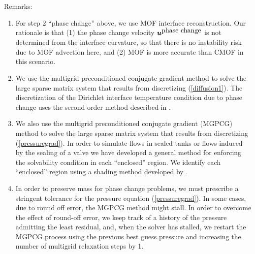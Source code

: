 \documentclass[]{article}
\newcommand{\bmu}{\mbox{\boldmath $u$\unboldmath}}
\begin{document}
Remarks:
\begin{enumerate}
\item For step 2 ``phase change'' above, we use MOF interface
 reconstruction.   Our rationale is that (1) the phase change
 velocity $\bmu^{\mbox{phase change}}$ is not  
 determined from the interface curvature, so that there is no
 instability risk due to MOF advection here, and (2) MOF is
 more accurate than CMOF in this scenario.
\item We use the multigrid preconditioned conjugate gradient 
 method \cite{tatebe1993multigrid}
 to solve the large sparse matrix system that
 results from discretizing (\ref{diffusion1}).  The discretization
 of the Dirichlet interface temperature condition due to 
 phase change uses the second order method described in 
 \cite{gibou2002second}.
\item We also use the multigrid preconditioned conjugate gradient (MGPCG)
 method \cite{tatebe1993multigrid}
 to solve the large sparse matrix system that
 results from discretizing (\ref{pressuregrad}).  In order
 to simulate flows in sealed tanks or flows induced by the 
 sealing of a valve \cite{arienti2014embedded} we have developed a general 
 method for enforcing the solvability condition in each 
 ``enclosed'' region.  We identify each ``enclosed'' region
 using a shading method developed by \cite{sussman2009stable}.
\item In order to preserve mass for phase change problems, we
  must prescribe a stringent tolerance for the pressure equation
  (\ref{pressuregrad}).  In some cases, due to round off error, the
  MGPCG method might stall.  In order to overcome the effect of 
  round-off error, we keep track of a history of the pressure
  admitting the least residual, and, when the solver has stalled,
  we restart the MGPCG process using the
  previous best guess pressure and
  increasing the number of multigrid relaxation steps by 1.
\end{enumerate}
\end{document}
